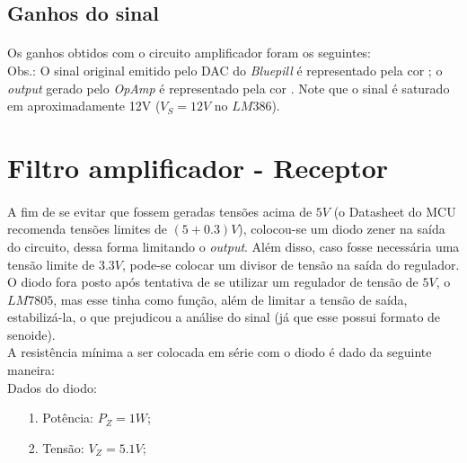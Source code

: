 \documentclass[12pt,a4paper]{report}
\begin{document}
		
	\subsection{Ganhos do sinal}
		\paragraph{} Os ganhos obtidos com o circuito amplificador foram os seguintes:\\
		
	
		Obs.: O sinal original emitido pelo DAC do {\it Bluepill} é representado pela cor ; o {\it output} gerado pelo {\it OpAmp} é representado pela cor . Note que o sinal é saturado em aproximadamente 12V ($V_S = 12V$ no $LM386$).
		
		
	\section{Filtro amplificador - Receptor}
		\paragraph{} A fim de se evitar que fossem geradas tensões acima de $5V$ (o Datasheet do MCU recomenda tensões limites de $(5+0.3)V$), colocou-se um diodo zener na saída do circuito, dessa forma limitando o {\it output}. Além disso, caso fosse necessária uma tensão limite de $3.3V$, pode-se colocar um divisor de tensão na saída do regulador. O diodo fora posto após tentativa de se utilizar um regulador de tensão de $5V$, o $LM7805$, mas esse tinha como função, além de limitar a tensão de saída, estabilizá-la, o que prejudicou a análise do sinal (já que esse possui formato de senoide).\\
		
		A resistência mínima a ser colocada em série com o diodo é dado da seguinte maneira:\\
		
		Dados do diodo:
		\begin{itemize}
			\item[1.] Potência: $P_Z = 1W$;
			\item[2.] Tensão: $V_Z = 5.1V$;
		\end{itemize}
		
\end{document}
